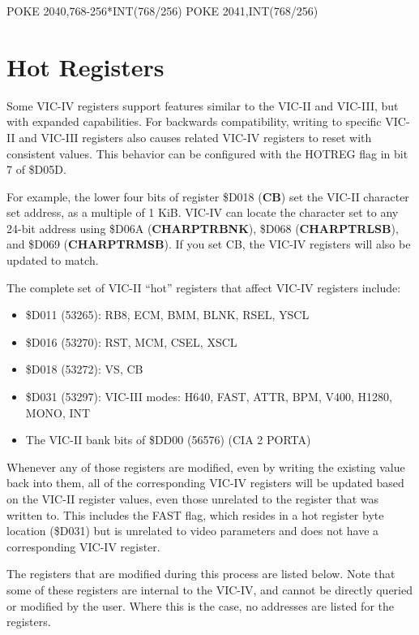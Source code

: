 \begin{screencode}
POKE 2040,768-256*INT(768/256)
POKE 2041,INT(768/256)
\end{screencode}

\section{Hot Registers}

Some VIC-IV registers support features similar to the VIC-II and VIC-III, but with expanded capabilities. For backwards compatibility, writing to specific VIC-II and VIC-III registers also causes related VIC-IV registers to reset with consistent values. This behavior can be configured with the HOTREG flag in bit 7 of \$D05D.

For example, the lower four bits of register \$D018 (\textbf{CB}) set the VIC-II character set address, as a multiple of 1 KiB. VIC-IV can locate the character set to any 24-bit address using \$D06A (\textbf{CHARPTRBNK}), \$D068 (\textbf{CHARPTRLSB}), and \$D069 (\textbf{CHARPTRMSB}). If you set CB, the VIC-IV registers will also be updated to match.

The complete set of VIC-II ``hot'' registers that affect VIC-IV registers include:

\begin{itemize}
\item \$D011 (53265): RB8, ECM, BMM, BLNK, RSEL, YSCL
\item \$D016 (53270): RST, MCM, CSEL, XSCL
\item \$D018 (53272): VS, CB
\item \$D031 (53297): VIC-III modes: H640, FAST, ATTR, BPM, V400, H1280, MONO, INT
\item The VIC-II bank bits of \$DD00 (56576) (CIA 2 PORTA)
\end{itemize}

Whenever any of those registers are modified, even by writing the existing value back into them, all of the corresponding VIC-IV registers will be updated based on the VIC-II register values, even those unrelated to the register that was written to. This includes the FAST flag, which resides in a hot register byte location (\$D031) but is unrelated to video parameters and does not have a corresponding VIC-IV register.

The registers that are modified during this process are listed below. Note that some of these registers are internal to the VIC-IV, and cannot be directly queried or modified by the user. Where this is the case, no addresses are listed for the registers.

